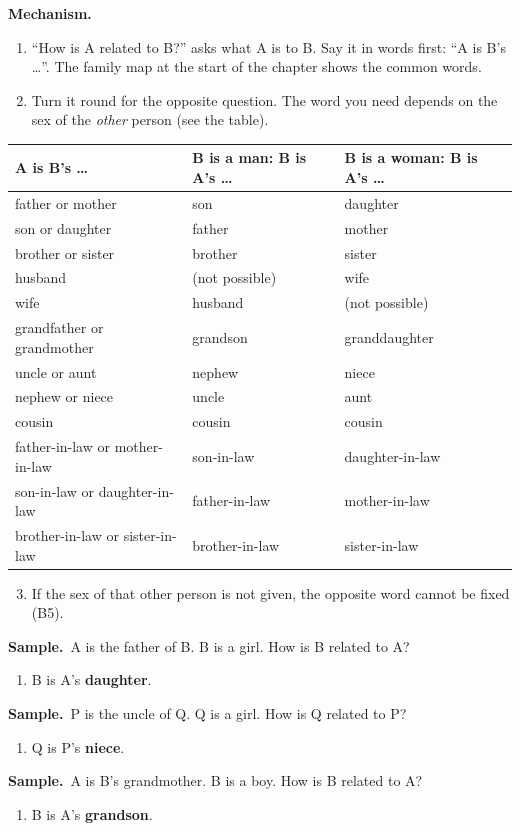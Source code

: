 \documentclass[11pt,a4paper]{article}
\newcommand{\mech}{\textbf{\color{ember}Mechanism.}\ }
\newif\ifkeepsamp
\newcommand{\samp}{\ifkeepsamp\needspace{4\baselineskip}\fi\textbf{\color{ember}Sample.}\ }
\begin{document}
\mech
\begin{enumerate}
\item ``How is A related to B?'' asks what A is to B. Say it in words first: ``A is B's \dots''. The family map at the start of the chapter shows the common words.
\item Turn it round for the opposite question. The word you need depends on the sex of the \emph{other} person (see the table).
\end{enumerate}
\begin{center}\small\renewcommand{\arraystretch}{1.18}\setlength{\tabcolsep}{8pt}
\begin{tabularx}{\linewidth}{@{}>{\raggedright\arraybackslash}X >{\raggedright\arraybackslash}X >{\raggedright\arraybackslash}X@{}}
\toprule
\textbf{\color{slate}A is B's \dots} & \textbf{\color{slate}B is a man: B is A's \dots} & \textbf{\color{slate}B is a woman: B is A's \dots} \\ \midrule
father or mother & son & daughter \\
son or daughter & father & mother \\
brother or sister & brother & sister \\
husband & (not possible) & wife \\
wife & husband & (not possible) \\
grandfather or grandmother & grandson & granddaughter \\
uncle or aunt & nephew & niece \\
nephew or niece & uncle & aunt \\
cousin & cousin & cousin \\
father-in-law or mother-in-law & son-in-law & daughter-in-law \\
son-in-law or daughter-in-law & father-in-law & mother-in-law \\
brother-in-law or sister-in-law & brother-in-law & sister-in-law \\
\bottomrule
\end{tabularx}\end{center}
\begin{enumerate}
\setcounter{enumi}{2}
\item If the sex of that other person is not given, the opposite word cannot be fixed (B5).
\end{enumerate}

\samp A is the father of B. B is a girl. How is B related to A?
\begin{enumerate}
\item B is A's \textbf{daughter}.
\end{enumerate}
\samp P is the uncle of Q. Q is a girl. How is Q related to P?
\begin{enumerate}
\item Q is P's \textbf{niece}.
\end{enumerate}
\samp A is B's grandmother. B is a boy. How is B related to A?
\begin{enumerate}
\item B is A's \textbf{grandson}.
\end{enumerate}
\end{document}
